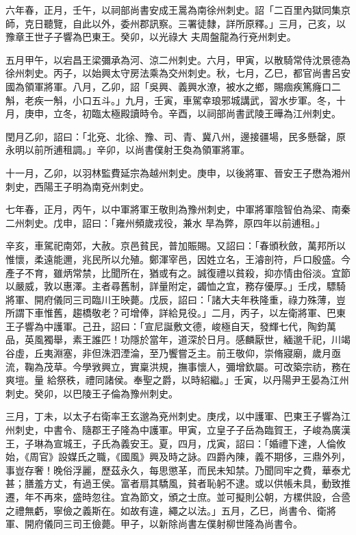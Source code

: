 \begin{pinyinscope}
 六年春，正月，壬午，以祠部尚書安成王暠為南徐州刺史。詔「二百里內獄同集京師，克日聽覽，自此以外，委州郡訊察。三署徒隸，詳所原釋。」三月，己亥，以豫章王世子子響為巴東王。癸卯，以光祿大
 夫周盤龍為行兗州刺史。



 五月甲午，以宕昌王梁彌承為河、涼二州刺史。六月，甲寅，以散騎常侍沈景德為徐州刺史。丙子，以始興太守房法乘為交州刺史。秋，七月，乙巳，都官尚書呂安國為領軍將軍。八月，乙卯，詔「吳興、義興水潦，被水之鄉，賜痼疾篤癃口二斛，老疾一斛，小口五斗。」九月，壬寅，車駕幸琅邪城講武，習水步軍。冬，十月，庚申，立冬，初臨太極殿讀時令。辛酉，以祠部尚書武陵王曄為江州刺史。



 閏月乙卯，詔曰：「北兗、北徐、豫、司、青、冀八州，邊接疆場，民多懸罄，原永明以前所逋租調。」辛卯，以尚書僕射王奐為領軍將軍。



 十一月，乙卯，以羽林監費延宗為越州刺史。庚申，以後將軍、晉安王子懋為湘州刺史，西陽王子明為南兗州刺史。



 七年春，正月，丙午，以中軍將軍王敬則為豫州刺史，中軍將軍陰智伯為梁、南秦二州刺史。戊申，詔曰：「雍州頻歲戎役，兼水
 旱為弊，原四年以前逋租。」



 辛亥，車駕祀南郊，大赦。京邑貧民，普加賑賜。又詔曰：「春頒秋斂，萬邦所以惟懷，柔遠能邇，兆民所以允殖。鄭渾宰邑，因姓立名，王濬剖符，戶口殷盛。今產子不育，雖炳常禁，比聞所在，猶或有之。誠復禮以貧殺，抑亦情由俗淡。宜節以嚴威，敦以惠澤。主者尋舊制，詳量附定，蠲恤之宜，務存優厚。」壬戌，驃騎將軍、開府儀同三司臨川王映薨。戊辰，詔曰：「諸大夫年秩隆重，祿力殊薄，豈所謂下車惟舊，趨橋敬老？可增俸，詳給見役。」二月，丙子，以左衛將軍、巴東王子響為中護軍。己丑，詔曰：「宣尼誕敷文德，峻極自天，發輝七代，陶鈞萬品，英風獨舉，素王誰匹！功隱於當年，道深於日月。感麟厭世，緬邈千祀，川竭谷虛，丘夷淵塞，非但洙泗湮淪，至乃饗嘗乏主。前王敬仰，崇脩寢廟，歲月亟流，鞠為茂草。今學敩興立，實稟洪規，撫事懷人，彌增欽屬。可改築宗祊，務在爽塏。量
 給祭秩，禮同諸侯。奉聖之爵，以時紹繼。」壬寅，以丹陽尹王晏為江州刺史。癸卯，以巴陵王子倫為豫州刺史。



 三月，丁未，以太子右衛率王玄邈為兗州刺史。庚戌，以中護軍、巴東王子響為江州刺史，中書令、隨郡王子隆為中護軍。甲寅，立皇子子岳為臨賀王，子峻為廣漢王，子琳為宣城王，子氏為義安王。夏，四月，戊寅，詔曰：「婚禮下達，人倫攸始，《周官》設媒氏之職，《國風》興及時之詠。四爵內陳，義不期侈，三鼎外列，事豈存奢！晚俗浮麗，歷茲永久，每思懲革，而民未知禁。乃聞同牢之費，華泰尤甚；膳羞方丈，有過王侯。富者扇其驕風，貧者恥躬不逮。或以供帳未具，動致推遷，年不再來，盛時忽往。宜為節文，頒之士庶。並可擬則公朝，方樏供設，合巹之禮無虧，寧儉之義斯在。如故有違，繩之以法。」五月，乙巳，尚書令、衛將軍、開府儀同三司王儉薨。甲子，以新除尚書左僕射柳世隆為尚書令。




\end{pinyinscope}
